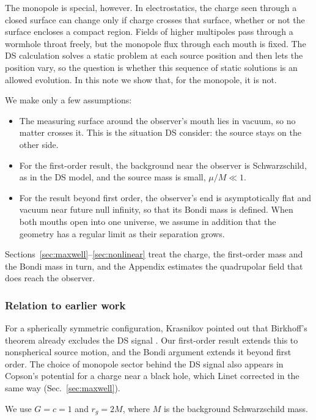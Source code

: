 \documentclass[aps,prd,10pt,onecolumn,nofootinbib,superscriptaddress,floatfix]{revtex4-2}
\begin{document}
The monopole is special, however.  In electrostatics, the charge seen through
a closed surface can change only if charge crosses that surface, whether or
not the surface encloses a compact region.  Fields of higher multipoles pass
through a wormhole throat freely, but the monopole flux through each mouth is
fixed.  The DS calculation solves a static problem at each source position and
then lets the position vary, so the question is whether this sequence of
static solutions is an allowed evolution.  In this note we show that, for the
monopole, it is not.

We make only a few assumptions:
\begin{itemize}
\item The measuring surface around the observer's mouth lies in vacuum, so
  no matter crosses it.  This is the situation DS consider: the source stays
  on the other side.
\item For the first-order result, the background near the observer is
  Schwarzschild, as in the DS model, and the source mass is small,
  $\mu/M\ll1$.
\item For the result beyond first order, the observer's end is
  asymptotically flat and vacuum near future null infinity, so that its Bondi
  mass is defined.  When both mouths open into one universe, we assume in
  addition that the geometry has a regular limit as their separation grows.
\end{itemize}

Sections~\ref{sec:maxwell}--\ref{sec:nonlinear} treat the charge, the
first-order mass and the Bondi mass in turn, and the Appendix estimates the
quadrupolar field that does reach the observer.

\subsubsection*{Relation to earlier work}

For a spherically symmetric configuration, Krasnikov pointed out that
Birkhoff's theorem already excludes the DS signal
\cite{Krasnikov2020CommentObserving}.  Our first-order result extends this to
nonspherical source motion, and the Bondi argument extends it beyond first
order.  The choice of monopole sector behind the DS signal also appears in
Copson's potential for a charge near a black hole, which Linet corrected in
the same way (Sec.~\ref{sec:maxwell}).

We use $G=c=1$ and $r_g=2M$, where $M$ is the background Schwarzschild mass.
\end{document}
